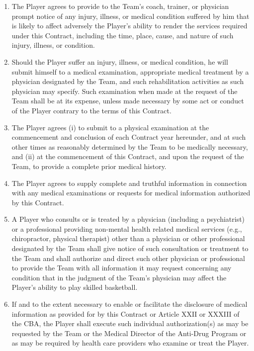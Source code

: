 \documentclass[
]{book}
\begin{document}
\begin{enumerate}
\item
  The Player agrees to provide to the Team's coach, trainer, or physician prompt notice of any injury, illness, or medical condition suffered by him that is likely to affect adversely the Player's ability to render the services required under this Contract, including the time, place, cause, and nature of such injury, illness, or condition.
\item
  Should the Player suffer an injury, illness, or medical condition, he will submit himself to a medical examination, appropriate medical treatment by a physician designated by the Team, and such rehabilitation activities as such physician may specify. Such examination when made at the request of the Team shall be at its expense, unless made necessary by some act or conduct of the Player contrary to the terms of this Contract.
\item
  The Player agrees (i) to submit to a physical examination at the commencement and conclusion of each Contract year hereunder, and at such other times as reasonably determined by the Team to be medically necessary, and (ii) at the commencement of this Contract, and upon the request of the Team, to provide a complete prior medical history.
\item
  The Player agrees to supply complete and truthful information in connection with any medical examinations or requests for medical information authorized by this Contract.
\item
  A Player who consults or is treated by a physician (including a psychiatrist) or a professional providing non-mental health related medical services (e.g., chiropractor, physical therapist) other than a physician or other professional designated by the Team shall give notice of such consultation or treatment to the Team and shall authorize and direct such other physician or professional to provide the Team with all information it may request concerning any condition that in the judgment of the Team's physician may affect the Player's ability to play skilled basketball.
\item
  If and to the extent necessary to enable or facilitate the disclosure of medical information as provided for by this Contract or Article XXII or XXXIII of the CBA, the Player shall execute such individual authorization(s) as may be requested by the Team or the Medical Director of the Anti-Drug Program or as may be required by health care providers who examine or treat the Player.
\end{enumerate}
\end{document}
